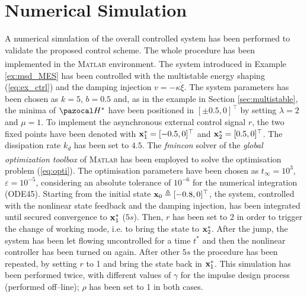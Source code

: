 \section{Numerical Simulation}
%
A numerical simulation of the overall controlled system has been performed to validate the proposed control scheme. The whole procedure has been implemented in the \textsc{Matlab}\textsuperscript{\textregistered}%
environment. The system introduced in Example \ref{ex:msd_MES} has been controlled with the multistable energy shaping (\ref{eq:ex_ctrl}) and the damping injection $v = -\kappa\dot{\xi}$. The system parameters has been chosen as $k = 5$, $b = 0.5$ and, as in the example in Section \ref{sec:multistable}, the minima of $\Ha^*$ have been positioned in $[\pm 0.5,0]^\top$ by setting $\lambda = 2$ and $\mu = 1$.
{%
To implement the asynchronous external control signal $r$, the two fixed points have been denoted with $\mathbf{x}_1^* = [-0.5,0]^\top$ and $\mathbf{x}_2^* = [0.5,0]^\top$.}
The dissipation rate $k_d$ has been set to $4.5$. 
The \textit{fmincon} solver of the \textit{global optimization toolbox} of \textsc{Matlab}\textsuperscript{\textregistered} has been employed to solve the optimisation problem (\ref{eq:opti}). The optimisation parameters have been chosen as $t_\infty=10^3$, $\varepsilon=10^{-5}$, considering an absolute tolerance of $10^{-6}$ for the numerical integration (ODE45).
Starting from the initial state $\mathbf{x}_0 \triangleq [-0.8,0]^\top$, the system, controlled with the nonlinear state feedback and the damping injection, has been integrated until secured convergence to $\mathbf{x}_1^*$ ($5s$). Then, $r$ has been set to 2 in order to trigger the change of working mode, i.e. to bring the state to $\mathbf{x}_2^*$. After the jump, the system has been let flowing uncontrolled for a time $t^*$ and then the nonlinear controller has been turned on again. After other $5s$ the procedure has been repeated, by setting $r$ to 1 and bring the state back in $\mathbf{x}_1^*$.
This simulation has been performed twice, with different values of $\gamma$ for the impulse design process (performed off--line); $\rho$ has been set to 1 in both cases. 


